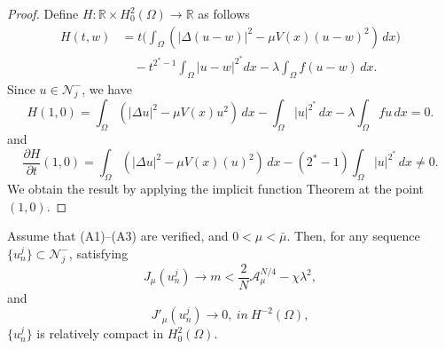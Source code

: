 \documentclass[reqno]{amsart}
\begin{document}
\begin{proof}
Define \(H:\mathbb{R} \times H^2_0(\Omega) \to \mathbb{R}\) as follows
\begin{align*}
 H(t,w)
 &=t\Big( \int_{\Omega}\left( |\Delta (u-w)|^2-\mu V(x)(u-w)^2\right)\,dx\Big)\\
 & \quad-t^{2^*-1}\int_{\Omega} |u-w|^{2^*}dx-\lambda \int_{\Omega} f(u-w)\,dx.
 \end{align*}
Since \(u\in \mathcal{N}^-_j\), we have
 \[
 H(1,0)= \int_{\Omega} \left( |\Delta u|^2-\mu V(x)u^2\right)\,dx -\int_{\Omega} |u|^{2^*}\,dx-\lambda \int_{\Omega} f u\,dx=0.
 \]
 and
 \[
 \frac{\partial H}{\partial t}(1,0)=\int_{\Omega} 
 \left( |\Delta u|^2-\mu V(x)(u)^2\right)\,dx-(2^*-1)\int_{\Omega} |u|^{2^*}\,dx \neq 0.
 \]
 We obtain the result by applying the implicit function Theorem at the point 
 \((1,0) \).
 \end{proof}
 
\begin{lemma}\label{l5}
Assume that {\rm (A1)--(A3)} are verified, and \(0<\mu<\bar{\mu}\). Then, for any 
sequence \(\{u_n^j\} \subset \mathcal{N}^-_j\), satisfying
 \[
 J_{\mu}(u_n^j)\to m<\frac{2}{N}\mathcal{A}_{\mu}^{N/4}-\chi \lambda^2,
 \]
 and
 \begin{equation}\label{p4}
 J'_{\mu}(u_n^j)\to 0, \ in \ H^{-2}(\Omega),
 \end{equation}
 \(\{u_n^j\}\) is relatively compact in \(H^{2}_0(\Omega)\).
 \end{lemma}
 
\end{document}
